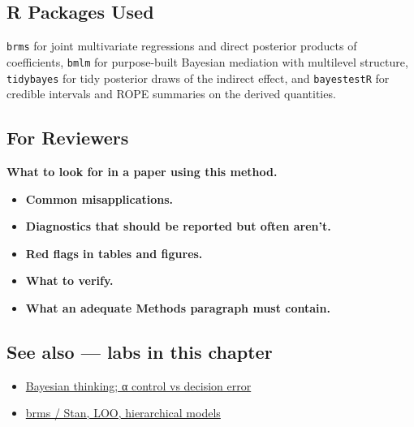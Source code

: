 \documentclass[
]{article}
\providecommand{\tightlist}{%
  \setlength{\itemsep}{0pt}\setlength{\parskip}{0pt}}
\begin{document}
\subsection{R Packages Used}\label{r-packages-used}

\texttt{brms} for joint multivariate regressions and direct posterior
products of coefficients, \texttt{bmlm} for purpose-built Bayesian
mediation with multilevel structure, \texttt{tidybayes} for tidy
posterior draws of the indirect effect, and \texttt{bayestestR} for
credible intervals and ROPE summaries on the derived quantities.

\subsection{For Reviewers}\label{for-reviewers}

\textbf{What to look for in a paper using this method.}

\begin{itemize}
\tightlist
\item
  \textbf{Common misapplications.}
\item
  \textbf{Diagnostics that should be reported but often aren't.}
\item
  \textbf{Red flags in tables and figures.}
\item
  \textbf{What to verify.}
\item
  \textbf{What an adequate Methods paragraph must contain.}
\end{itemize}

\subsection{See also --- labs in this
chapter}\label{see-also-labs-in-this-chapter}

\begin{itemize}
\tightlist
\item
  \href{labs/lab-bayesian-thinking-control-vs-decision-error.Rmd}{Bayesian
  thinking; α control vs decision error}
\item
  \href{labs/lab-brms-stan-loo-hierarchical-models.Rmd}{brms / Stan,
  LOO, hierarchical models}
\end{itemize}
\end{document}
